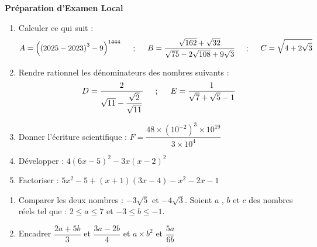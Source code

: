 \documentclass[a4paper,12pt]{article}
\begin{document}
\begin{tcolorbox}[enhanced,colback=white,colframe=black] 
{\begin{center}\Large \textbf{ Préparation d'Examen Local  }\end{center}}
\end{tcolorbox}
\begin{exo}
\begin{enumerate}
\item Calculer ce qui suit :
$$
A=\left(\left(2025-2023\right)^{3}-9\right)^{1444}  
\hspace{0.5cm};\hspace{0.5cm}
B=\dfrac{\sqrt{162}+\sqrt{32}}{\sqrt{75}-2\sqrt{108}+9\sqrt{3}}
\hspace{0.5cm};\hspace{0.5cm}
C=\sqrt{4+2\sqrt{3}}
$$
\item Rendre rationnel les dénominateurs des nombres suivants : 
$$
D=\dfrac{2}{\sqrt{11}-\dfrac{\sqrt{2}}{\sqrt{11}}}
\hspace{0.5cm};\hspace{0.5cm}
E=\dfrac{1}{\sqrt{7}+\sqrt{5}-1}
$$
\item Donner l'écriture scientifique : $F=\dfrac{48\times (10^{-2})^{3}\times 10^{19}}{3\times 10^{4}}$
\item Développer : $4\left(6x-5\right)^{2}-3x\left(x-2\right)^{2}$ 
\item Factoriser : $5x^{2}-5+\left(x+1\right)\left(3x-4\right)-x^{2}-2x-1$
\end{enumerate}
\end{exo}

\begin{exo}
\begin{enumerate}
\item Comparer les deux nombres : $-3\sqrt{5}$ et $-4\sqrt{3}$.\newline
Soient $a$ , $b$ et $c$ des nombres réels tel que  : $2\leq a \leq 7$ et $-3\leq b \leq -1$. 
\item Encadrer $\dfrac{2a+5b}{3}$ et $\dfrac{3a-2b}{4}$ et $a\times b^{2}$ et $\dfrac{5a}{6b}$

\end{enumerate}
\end{exo}
\end{document}
